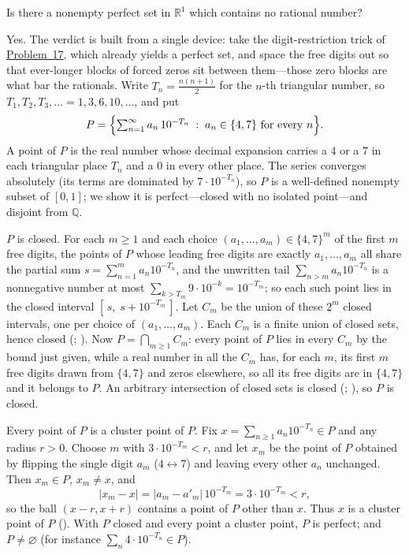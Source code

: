 \documentclass[main.tex]{subfiles}
\begin{document}
Is there a nonempty perfect set in $\mathbb R^{1}$ which contains no rational number?

\begin{SolutionBlue}
Yes. The verdict is built from a single device: take the digit-restriction trick of
\hyperlink{prob:17}{Problem~17}, which already yields a perfect set, and space the free digits out so
that ever-longer blocks of forced zeros sit between them---those zero blocks are what bar the rationals.
Write $T_n=\tfrac{n(n+1)}2$ for the $n$-th triangular number, so $T_1,T_2,T_3,\dots=1,3,6,10,\dots$, and
put
\[
P=\Bigl\{\textstyle\sum_{n=1}^{\infty}a_n\,10^{-T_n}\;:\;a_n\in\{4,7\}\ \text{for every }n\Bigr\}.
\]
A point of $P$ is the real number whose decimal expansion carries a $4$ or a $7$ in each triangular place
$T_n$ and a $0$ in every other place. The series converges absolutely (its terms are dominated by
$7\cdot 10^{-T_n}$), so $P$ is a well-defined nonempty subset of $[0,1]$; we show it is perfect---closed
with no isolated point---and disjoint from $\mathbb Q$.

$P$ is closed. For each $m\ge 1$ and each choice $(a_1,\dots,a_m)\in\{4,7\}^m$ of the first $m$ free
digits, the points of $P$ whose leading free digits are exactly $a_1,\dots,a_m$ all share the partial sum
$s=\sum_{n=1}^{m}a_n10^{-T_n}$, and the unwritten tail $\sum_{n>m}a_n10^{-T_n}$ is a nonnegative number at
most $\sum_{k>T_m}9\cdot10^{-k}=10^{-T_m}$; so each such point lies in the closed interval
$[\,s,\;s+10^{-T_m}\,]$. Let $C_m$ be the union of these $2^m$ closed intervals, one per choice of
$(a_1,\dots,a_m)$. Each $C_m$ is a finite union of closed sets, hence closed (;
). Now $P=\bigcap_{m\ge 1}C_m$: every point
of $P$ lies in every $C_m$ by the bound just given, while a real number in all the $C_m$ has, for each
$m$, its first $m$ free digits drawn from $\{4,7\}$ and zeros elsewhere, so all its free digits are in
$\{4,7\}$ and it belongs to $P$. An arbitrary intersection of closed sets is closed (;
), so $P$ is closed.

Every point of $P$ is a cluster point of $P$. Fix $x=\sum_{n\ge1}a_n10^{-T_n}\in P$ and any radius
$r>0$. Choose $m$ with $3\cdot 10^{-T_m}<r$, and let $x_m$ be the point of $P$ obtained by flipping the
single digit $a_m$ ($4\leftrightarrow 7$) and leaving every other $a_n$ unchanged. Then $x_m\in P$,
$x_m\neq x$, and
\[
|x_m-x|=|a_m-a'_m|\,10^{-T_m}=3\cdot 10^{-T_m}<r,
\]
so the ball $(x-r,x+r)$ contains a point of $P$ other than $x$. Thus $x$ is a cluster point of $P$
(). With $P$ closed and every point a cluster point, $P$ is perfect; and $P\neq\varnothing$
(for instance $\sum_n 4\cdot10^{-T_n}\in P$).


\end{SolutionBlue}
\end{document}
